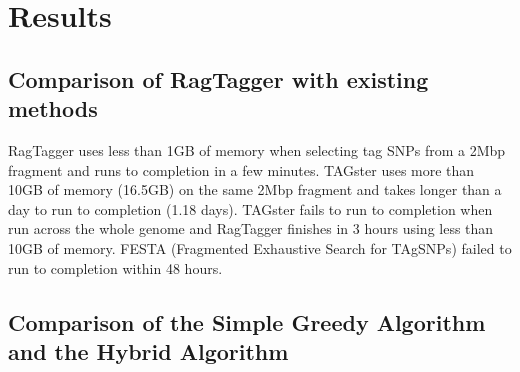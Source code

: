 \section{Results}

\subsection{Comparison of RagTagger with existing methods}
RagTagger uses less than 1GB of memory when selecting tag SNPs from a 2\gls{Mbp} fragment and runs to completion in a few minutes. TAGster\cite{Xu2007} uses more than 10GB of memory (16.5GB) on the same 2\gls{Mbp} fragment and takes longer than a day to run to completion (1.18 days). TAGster fails to run to completion when run across the whole genome and RagTagger finishes in 3 hours using less than 10GB of memory. FESTA (Fragmented Exhaustive Search for TAgSNPs)\cite{Qin15012006} failed to run to completion within 48 hours.

\subsection{Comparison of the Simple Greedy Algorithm and the Hybrid Algorithm}

